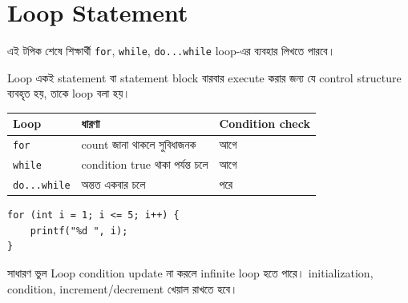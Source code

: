 \section{Loop Statement}

\begin{learningbox}
এই টপিক শেষে শিক্ষার্থী \texttt{for}, \texttt{while}, \texttt{do...while} loop-এর ব্যবহার লিখতে পারবে।
\end{learningbox}

\begin{definitionbox}{Loop}
একই statement বা statement block বারবার execute করার জন্য যে control structure ব্যবহৃত হয়, তাকে loop বলা হয়।
\end{definitionbox}

\begin{center}
\begin{tabular}{|p{}|p{}|p{}|}
\hline
\textbf{Loop} & \textbf{ধারণা} & \textbf{Condition check} \\
\hline
\texttt{for} & count জানা থাকলে সুবিধাজনক & আগে \\
\hline
\texttt{while} & condition true থাকা পর্যন্ত চলে & আগে \\
\hline
\texttt{do...while} & অন্তত একবার চলে & পরে \\
\hline
\end{tabular}
\end{center}

\begin{verbatim}
for (int i = 1; i <= 5; i++) {
    printf("%d ", i);
}
\end{verbatim}

\begin{mistakebox}{সাধারণ ভুল}
Loop condition update না করলে infinite loop হতে পারে। initialization, condition, increment/decrement খেয়াল রাখতে হবে।
\end{mistakebox}
